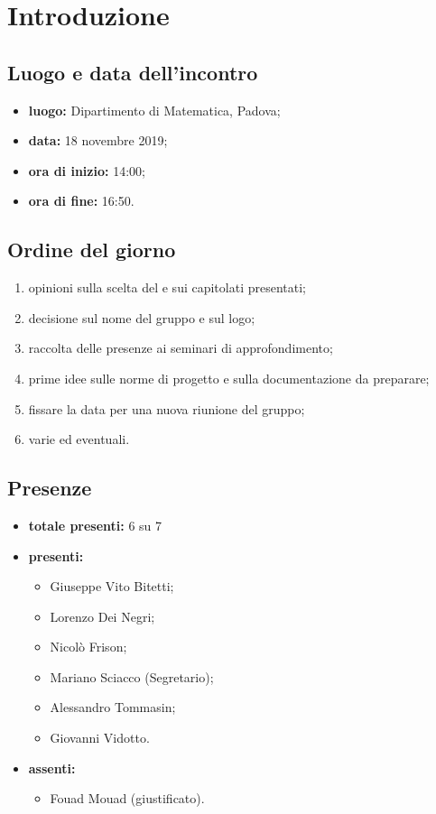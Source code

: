 \section*{Introduzione}

\subsection*{Luogo e data dell'incontro}
	\begin{itemize}
		\item \textbf{luogo:} Dipartimento di Matematica, Padova;
		\item \textbf{data:} 18 novembre 2019;
		\item \textbf{ora di inizio:} 14:00;
		\item \textbf{ora di fine:} 16:50.
	\end{itemize}

\subsection*{Ordine del giorno}
	\begin{enumerate}

		\item opinioni sulla scelta del  e sui capitolati presentati;
		\item decisione sul nome del gruppo e sul logo;
		\item raccolta delle presenze ai seminari di approfondimento;
		\item prime idee sulle norme di progetto e sulla documentazione da preparare;
		\item fissare la data per una nuova riunione del gruppo;
		\item varie ed eventuali.

	\end{enumerate}

\subsection*{Presenze}
	\begin{itemize}
		\item \textbf{totale presenti:} 6 su 7
		\item \textbf{presenti: }
			\begin{itemize}			
				\item Giuseppe Vito Bitetti;
				\item Lorenzo Dei Negri;
				\item Nicolò Frison;
				\item Mariano Sciacco (Segretario);
				\item Alessandro Tommasin;
				\item Giovanni Vidotto.
			\end{itemize}
		\item \textbf{assenti: } 
			\begin{itemize}	
				\item Fouad Mouad (giustificato).
			\end{itemize}
	\end{itemize}


